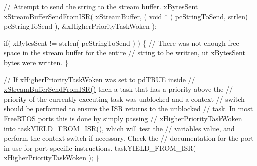 \begin{DoxyPre} // Attempt to send the string to the stream buffer.
 xBytesSent = xStreamBufferSendFromISR( xStreamBuffer,
                                        ( void * ) pcStringToSend,
                                        strlen( pcStringToSend ),
                                        \&xHigherPriorityTaskWoken );\end{DoxyPre}



\begin{DoxyPre} if( xBytesSent != strlen( pcStringToSend ) )
 \{
     // There was not enough free space in the stream buffer for the entire
     // string to be written, ut xBytesSent bytes were written.
 \}\end{DoxyPre}



\begin{DoxyPre} // If xHigherPriorityTaskWoken was set to pdTRUE inside
 // \hyperlink{stream__buffer_8h_a1dab226e99230e01e79bc2b5c0605e44}{xStreamBufferSendFromISR()} then a task that has a priority above the
 // priority of the currently executing task was unblocked and a context
 // switch should be performed to ensure the ISR returns to the unblocked
 // task.  In most FreeRTOS ports this is done by simply passing
 // xHigherPriorityTaskWoken into taskYIELD\_FROM\_ISR(), which will test the
 // variables value, and perform the context switch if necessary.  Check the
 // documentation for the port in use for port specific instructions.
 taskYIELD\_FROM\_ISR( xHigherPriorityTaskWoken );
\}
\end{DoxyPre}
 